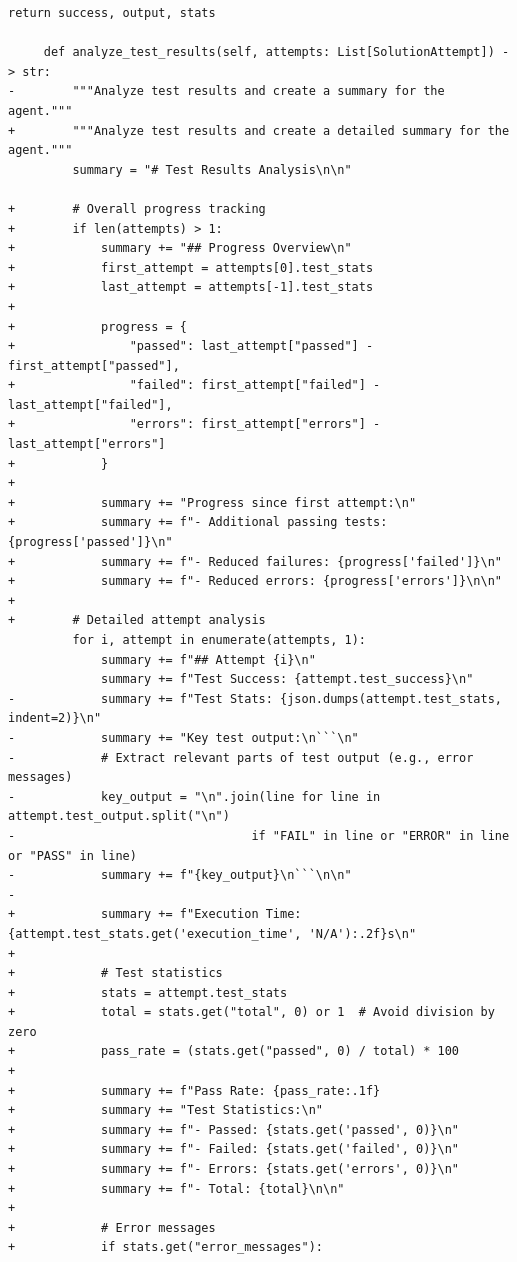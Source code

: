 \documentclass{article}
\begin{document}
\begin{lstlisting}[style=diffstyle]
         return success, output, stats
 
     def analyze_test_results(self, attempts: List[SolutionAttempt]) -> str:
-        """Analyze test results and create a summary for the agent."""
+        """Analyze test results and create a detailed summary for the agent."""
         summary = "# Test Results Analysis\n\n"
         
+        # Overall progress tracking
+        if len(attempts) > 1:
+            summary += "## Progress Overview\n"
+            first_attempt = attempts[0].test_stats
+            last_attempt = attempts[-1].test_stats
+            
+            progress = {
+                "passed": last_attempt["passed"] - first_attempt["passed"],
+                "failed": first_attempt["failed"] - last_attempt["failed"],
+                "errors": first_attempt["errors"] - last_attempt["errors"]
+            }
+            
+            summary += "Progress since first attempt:\n"
+            summary += f"- Additional passing tests: {progress['passed']}\n"
+            summary += f"- Reduced failures: {progress['failed']}\n"
+            summary += f"- Reduced errors: {progress['errors']}\n\n"
+        
+        # Detailed attempt analysis
         for i, attempt in enumerate(attempts, 1):
             summary += f"## Attempt {i}\n"
             summary += f"Test Success: {attempt.test_success}\n"
-            summary += f"Test Stats: {json.dumps(attempt.test_stats, indent=2)}\n"
-            summary += "Key test output:\n```\n"
-            # Extract relevant parts of test output (e.g., error messages)
-            key_output = "\n".join(line for line in attempt.test_output.split("\n") 
-                                 if "FAIL" in line or "ERROR" in line or "PASS" in line)
-            summary += f"{key_output}\n```\n\n"
-
+            summary += f"Execution Time: {attempt.test_stats.get('execution_time', 'N/A'):.2f}s\n"
+            
+            # Test statistics
+            stats = attempt.test_stats
+            total = stats.get("total", 0) or 1  # Avoid division by zero
+            pass_rate = (stats.get("passed", 0) / total) * 100
+            
+            summary += f"Pass Rate: {pass_rate:.1f}
+            summary += "Test Statistics:\n"
+            summary += f"- Passed: {stats.get('passed', 0)}\n"
+            summary += f"- Failed: {stats.get('failed', 0)}\n"
+            summary += f"- Errors: {stats.get('errors', 0)}\n"
+            summary += f"- Total: {total}\n\n"
+            
+            # Error messages
+            if stats.get("error_messages"):

\end{lstlisting}
\end{document}
